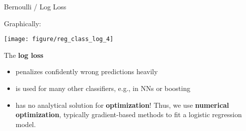 \documentclass[11pt,compress,t,notes=noshow, xcolor=table]{beamer}
\begin{document}
\begin{vbframe}{Bernoulli / Log Loss}

Graphically:

\begin{knitrout}\scriptsize
{}\color{fgcolor}

{\centering \texttt{[image: figure/reg\_class\_log\_4]}  

}

\end{knitrout}
The \textbf{log loss}
\begin{itemize}
  \item penalizes confidently wrong predictions heavily
  \item is used for many other classifiers, e.g., in NNs or boosting 
  \item has no analytical solution for \textbf{optimization}! Thus, we use \textbf{numerical optimization}, typically gradient-based methods to fit a logistic regression model.
\end{itemize}


\end{vbframe}
\end{document}
